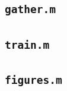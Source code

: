 \documentclass[12pt,letter]{article}
\begin{document}
\subsection{\texttt{gather.m}}
\label{scr:gather}


\subsection{\texttt{train.m}}
\label{scr:train}


\subsection{\texttt{figures.m}}
\label{scr:figures}




\end{document}
